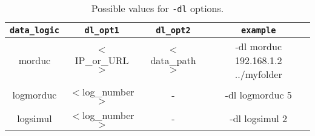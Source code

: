 \begin{table}[!h]
  \centering  
  \begin{tabular}{| c | c | c | c |}

    \hline
    \texttt{data\_logic} &
    \texttt{dl\_opt1} &
    \texttt{dl\_opt2} &
    \texttt{example} \\

    \hline
    \small {morduc} &
    \small {$<$IP\_or\_URL$>$} &
    \small {$<$data\_path$>$} &
    \small{-dl morduc 192.168.1.2 ../myfolder} \\

    \hline
    \small {logmorduc} &
    \small {$<$log\_number$>$} &
    \small {-} &
    \small{-dl logmorduc 5} \\


    \hline
    \small {logsimul} &
    \small {$<$log\_number$>$} &
    \small {-} &
    \small {-dl logsimul 2} \\

    \hline

  \end{tabular}
  \caption{Possible values for \texttt{-dl} options.}
  \label{table:dloptions}
\end{table}

